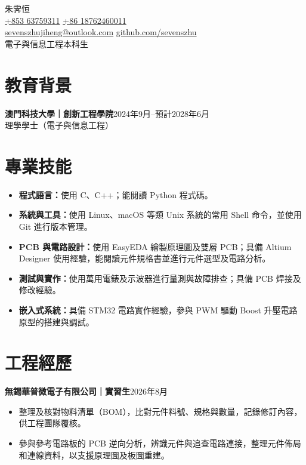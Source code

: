 \documentclass[11pt,a4paper]{article}
\begin{document}
\raggedright

\begin{center}
  {\namefont\LARGE 朱霁恒}\\[6pt]
  \href{tel:+85363759311}{+853 63759311}\quad\textbar\quad
  \href{tel:+8618762460011}{+86 18762460011}\\[2pt]
  \href{mailto:sevenszhujiheng@outlook.com}{sevenszhujiheng@outlook.com}\quad\textbar\quad
  \href{https://github.com/sevenszhu}{github.com/sevenszhu}\\[3pt]
  電子與信息工程本科生
\end{center}

\section*{教育背景}
\textbf{澳門科技大學｜創新工程學院}\hfill 2024年9月--預計2028年6月\\
理學學士（電子與信息工程）

\section*{專業技能}
\begin{itemize}
  \item \textbf{程式語言：}使用 C、C++；能閱讀 Python 程式碼。
  \item \textbf{系統與工具：}使用 Linux、macOS 等類 Unix 系統的常用 Shell 命令，並使用 Git 進行版本管理。
  \item \textbf{PCB 與電路設計：}使用 EasyEDA 繪製原理圖及雙層 PCB；具備 Altium Designer 使用經驗，能閱讀元件規格書並進行元件選型及電路分析。
  \item \textbf{測試與實作：}使用萬用電錶及示波器進行量測與故障排查；具備 PCB 焊接及修改經驗。
  \item \textbf{嵌入式系統：}具備 STM32 電路實作經驗，參與 PWM 驅動 Boost 升壓電路原型的搭建與調試。
\end{itemize}

\section*{工程經歷}
\textbf{無錫華普微電子有限公司｜實習生}\hfill 2026年8月
\begin{itemize}
  \item 整理及核對物料清單（BOM），比對元件料號、規格與數量，記錄修訂內容，供工程團隊覆核。
  \item 參與參考電路板的 PCB 逆向分析，辨識元件與追查電路連接，整理元件佈局和連線資料，以支援原理圖及板圖重建。
\end{itemize}
\end{document}
